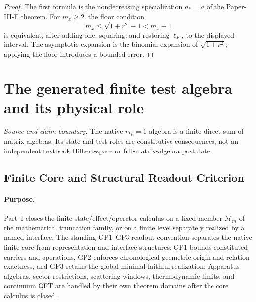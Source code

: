 \documentclass[12pt,a4paper]{article}
\begin{document}
\begin{proof}
The first formula is the nondecreasing specialization \(a_*=a\) of the
Paper-III-F theorem.  For \(m_x\ge2\), the floor condition
\[
 m_x\le\sqrt{1+r^2}-1<m_x+1
\]
is equivalent, after adding one, squaring, and restoring
\(\ell_F\), to the displayed interval.  The asymptotic expansion is
the binomial expansion of \(\sqrt{1+r^2}\); applying the floor introduces a
bounded error.
\end{proof}



\section{The generated finite test algebra and its physical role}
\label{p4a:sec:v238-a2}
\noindent\textit{Source and claim boundary.} The native $m_p=1$ algebra is a finite direct sum of matrix algebras. Its state and test roles are constitutive consequences, not an independent textbook Hilbert-space or full-matrix-algebra postulate.

\subsection{Finite Core and Structural Readout Criterion}
\label{p4:sec:part1-scope}

\paragraph{Purpose.}
Part~I closes the finite state/effect/operator calculus on a fixed member
\(\mathcal H_m\) of the mathematical truncation family, or on a finite level
separately realized by a named interface.  The
standing GP1--GP3 readout convention separates the native finite core from
representation and interface structures: GP1 bounds constituted carriers and
operations, GP2 enforces chronological geometric origin and relation
exactness, and GP3 retains the global minimal faithful realization.  Apparatus
algebras, sector restrictions, scattering windows, thermodynamic limits, and
continuum QFT are handled by their own theorem domains after the core calculus
is closed.
\end{document}
